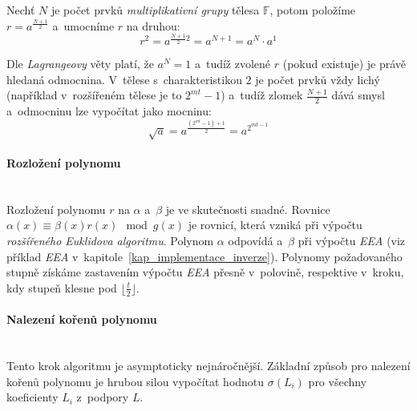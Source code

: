 \documentclass[thesis=M,czech,hidelinks]{FITthesis}[2012/06/26]
\newcommand{\0}{{\textcolor[gray]{0.75}{0}}}
\begin{document}
Nechť $N$ je počet prvků \emph{multiplikativní grupy} tělesa $\mathbb{F}$, potom
položíme \\
$r = a^{\frac{N+1}{2}} $ a~umocníme $r$ na druhou:
$$ r^2 = a^{\frac{N+1}{2} 2} = a^{N+1} = a^N \cdot a^1 $$

Dle \emph{Lagrangeovy} věty platí, že $a^N = 1 $ a~tudíž zvolené $r$ (pokud
existuje) je právě hledaná odmocnina. V~tělese s~charakteristikou $2$ je počet
prvků vždy lichý (například v~rozšířeném tělese je to $2^{mt}-1$) a~tudíž zlomek
$\frac{N+1}{2}$ dává smysl a~odmocninu lze vypočítat jako mocninu:
$$ \sqrt{a} = a^{\frac{(2^{mt}-1) + 1}{2}} = a^{2^{mt - 1}} $$

\paragraph{Rozložení polynomu} \hfil \\
Rozložení polynomu $r$ na $\alpha$ a~$\beta$ je ve skutečnosti snadné. Rovnice
$\alpha(x) \equiv \beta(x) r(x) \mod g(x)$ je rovnicí, která vzniká při výpočtu
\emph{rozšířeného Euklidova algoritmu}. Polynom $\alpha$ odpovídá 
a~$\beta$  při výpočtu \emph{EEA} (viz příklad \emph{EEA}
v~kapitole~\ref{kap_implementace_inverze}). Polynomy požadovaného stupně získáme
zastavením výpočtu \emph{EEA} přesně v~polovině, respektive v~kroku, kdy
stupeň  klesne pod $\lfloor\frac{t}{2}\rfloor$.

\paragraph{Nalezení kořenů polynomu} \hfil \\
Tento krok algoritmu je asymptoticky nejnáročnější. Základní způsob pro nalezení
kořenů polynomu je hrubou silou vypočítat hodnotu $\sigma(L_i)$ pro všechny
koeficienty $L_i$ z~podpory $L$.
\end{document}
